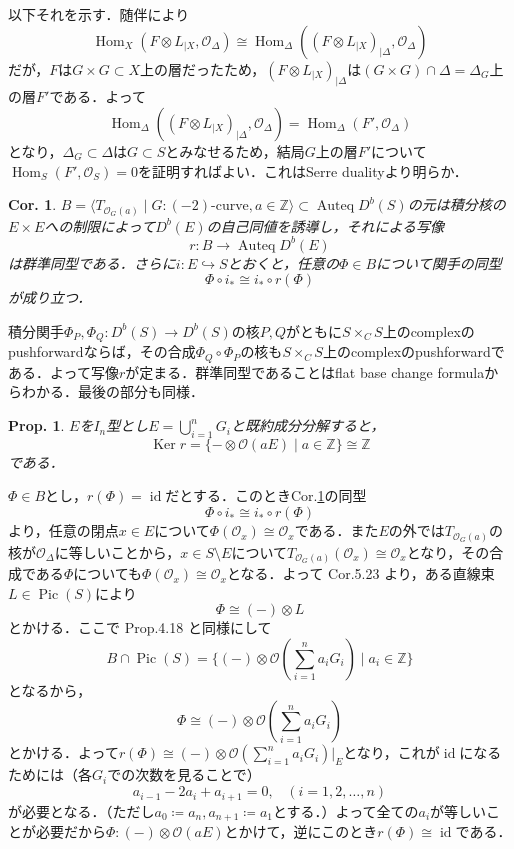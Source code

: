 \documentclass[uplatex,a4paper,11pt,dvipdfmx]{jsarticle}
\makeatletter
\theoremstyle{mystyle} %
\newtheorem{proposition}[theorem]{Prop.}
\newtheorem{corollary}[theorem]{Cor.}
\renewenvironment{proof}[1][\proofname]{\par
 \pushQED{\qed}%
 \normalfont \topsep6\p@\@plus6\p@\relax
 \trivlist
 \item[\hskip\labelsep
 \itshape
 {\bf\underline{#1}}]\ignorespaces
}{%
 \popQED\endtrivlist\@endpefalse
}
\DeclareMathOperator{\Auteq}{Auteq}\DeclareMathOperator{\Coh}{Coh}
\DeclareMathOperator{\Hom}{Hom}
\DeclareMathOperator{\Ker}{Ker}
\DeclareMathOperator{\Pic}{Pic}
\DeclareMathOperator{\id}{id}
\makeatother
\begin{document}
\begin{proof}
	以下それを示す．随伴により$$\Hom_X(F\otimes L_{|X}, \mathcal{O}_\Delta)\cong\Hom_\Delta((F\otimes L_{|X})_{|\Delta}, \mathcal{O}_\Delta)$$だが，$F$は$G \times G \subset X$上の層だったため，$(F\otimes L_{|X})_{|\Delta}$は$(G \times G) \cap \Delta = \Delta_G$上の層$F'$である．よって$$\Hom_\Delta((F\otimes L_{|X})_{|\Delta}, \mathcal{O}_\Delta)=\Hom_\Delta(F', \mathcal{O}_\Delta)$$となり，$\Delta_G \subset \Delta$は$G \subset S$とみなせるため，結局$G$上の層$F'$について$\Hom_S(F', \mathcal{O}_S)=0$を証明すればよい．これはSerre dualityより明らか．
\end{proof}

\begin{corollary}\label{restriction_map}
	$B = \langle T_{\mathcal{O}_G(a)} \mid G \colon \text{$(-2)$-curve}, a \in \mathbb{Z} \rangle \subset \Auteq D^b(S)$の元は積分核の$E\times E$への制限によって$D^b(E)$の自己同値を誘導し，それによる写像$$r \colon B \to \Auteq D^b(E)$$は群準同型である．さらに$i \colon E \hookrightarrow S$とおくと，任意の$\Phi \in B$について関手の同型$$\Phi \circ i_* \cong i_* \circ r(\Phi)$$が成り立つ．
\end{corollary}
\begin{proof}
	積分関手$\Phi_P, \Phi_Q \colon D^b(S) \to D^b(S)$の核$P, Q$がともに$S \times_C S$上のcomplexのpushforwardならば，その合成$\Phi_Q \circ \Phi_P$の核も$S \times_C S$上のcomplexのpushforwardである．よって写像$r$が定まる．群準同型であることはflat base change formulaからわかる．最後の部分も同様．
\end{proof}
\begin{proposition}
	$E$を$I_n$型とし$E = \bigcup_{i=1}^n G_i$と既約成分分解すると，$$\Ker r = \{-\otimes \mathcal{O}(aE) \mid a \in \mathbb{Z}\} \cong \mathbb{Z}$$である．
\end{proposition}
\begin{proof}
	$\Phi \in B$とし，$r(\Phi) = \id$だとする．このときCor.\ref{restriction_map}の同型$$\Phi \circ i_* \cong i_* \circ r(\Phi)$$より，任意の閉点$x \in E$について$\Phi(\mathcal{O}_x) \cong \mathcal{O}_x$である．また$E$の外では$T_{\mathcal{O}_G(a)}$の核が$\mathcal{O}_\Delta$に等しいことから，$x \in S\setminus E$について$T_{\mathcal{O}_G(a)}(\mathcal{O}_x) \cong \mathcal{O}_x$となり，その合成である$\Phi$についても$\Phi(\mathcal{O}_x) \cong\mathcal{O}_x$となる．よって\cite{Huy06} Cor.5.23 より，ある直線束$L \in \Pic(S)$により$$\Phi \cong (-)\otimes L$$とかける．ここで\cite{IU05} Prop.4.18 と同様にして$$B \cap \Pic(S) = \{ (-)\otimes \mathcal{O}(\sum_{i=1}^n a_iG_i) \mid a_i \in \mathbb{Z}\}$$となるから，$$\Phi \cong (-)\otimes \mathcal{O}(\sum_{i=1}^n a_iG_i)$$とかける．よって$r(\Phi) \cong (-)\otimes \mathcal{O}(\sum_{i=1}^n a_iG_i)|_E$となり，これが$\id$になるためには（各$G_i$での次数を見ることで）$$a_{i-1} - 2a_i + a_{i+1} = 0, \hspace{10pt} (i = 1, 2, \dots, n)$$が必要となる．（ただし$a_0 \coloneqq a_n, a_{n+1} \coloneqq a_1$とする．）よって全ての$a_i$が等しいことが必要だから$\Phi \colon (-)\otimes \mathcal{O}(aE)$とかけて，逆にこのとき$r(\Phi) \cong \id$である．
\end{proof}
\end{document}

